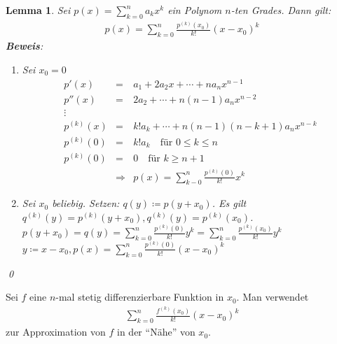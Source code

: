 \documentclass[ngerman,titlepage,twoside, parskip=half*]{scrreprt}
\theoremstyle{break}
\newtheorem{lemma}{Lemma}
\theoremstyle{nonumberbreak}
\begin{document}
\begin{lemma}
  Sei $p(x)=\sum_{k=0}^n a_kx^k$ ein Polynom $n$-ten Grades. Dann gilt:
  \begin{gather*}p(x)=\sum_{k=0}^n \frac{p^{(k)}(x_0)}{k!} (x-x_0)^k\end{gather*}
  \textbf{Beweis}:
  \begin{enumerate}[1. F{a}ll]
    \item Sei $x_0=0$
      \begin{align*}
	p'(x)&=& a_1+2a_2x+\cdots+na_nx^{n-1}\\
	p''(x)&=& 2a_2+\cdots+n(n-1)a_nx^{n-2}\\
	\vdots\\
	p^{(k)}(x)&=& k!a_k+\cdots+n(n-1)(n-k+1)a_nx^{n-k}\\
	p^{(k)}(0)&=& k!a_k \quad\text{für } 0\leq k\leq n\\
	p^{(k)}(0)&=& 0 \quad\text{für } k\geq n+1\\
	&\Rightarrow & p(x)=\sum_{k-0}^n \frac{p^{(k)}(0)}{k!}x^k
      \end{align*}
    \item Sei $x_0$ beliebig. Setzen: $q(y)\coloneqq p(y+x_0)$. Es gilt $q^{(k)}
      (y)=p^{(k)}(y+x_0), q^{(k)}(y)=p^{(k)}(x_0)$.\\
      $p(y+x_0)=q(y)=\sum_{k=0}^n \frac{p^{(k)}(0)}{k!}y^k=\sum_{k=0}^n
      \frac{p^{(k)}(x_0)}{k!}y^k$\\
      $y\coloneqq x-x_0, p(x)=\sum_{k=0}^n \frac{p^{(k)}(0)}{k!}(x-x_0)^k$
  \end{enumerate}
  \qed
\end{lemma}

Sei $f$ eine $n$-mal stetig differenzierbare Funktion in $x_0$. Man
verwendet 
\begin{gather*}\sum_{k=0}^n \frac{f^{(k)}(x_0)}{k!}(x-x_0)^k\end{gather*}
zur Approximation von $f$ in der "`Nähe"' von $x_0$.
\end{document}
